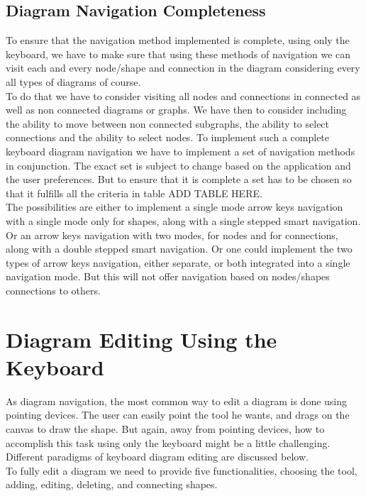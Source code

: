 \begin{itemize}
\subsection{Diagram Navigation Completeness}
\par \noindent
To ensure that the navigation method implemented is complete, using only the keyboard, we have to make sure that using these methods of navigation we can visit each and every node/shape and connection in the diagram considering every all types of diagrams of course.\\
To do that we have to consider visiting all nodes and connections in connected as well as non connected diagrams or graphs. We have then to consider including the ability to move between non connected subgraphs, the ability to select connections and the ability to select nodes. To implement such a complete keyboard diagram navigation we have to implement a set of navigation methods in conjunction. The exact set is subject to change based on the application and the user preferences. But to ensure that it is complete a set has to be chosen so that it fulfills all the criteria in table ADD TABLE HERE.\\
The possibilities are either to implement a single mode arrow keys navigation with a single mode only for shapes, along with a single stepped smart navigation. Or an arrow keys navigation with two modes, for nodes and for connections, along with a double stepped smart navigation. Or one could implement the two types of arrow keys navigation, either separate, or both integrated into a single navigation mode. But this will not offer navigation based on nodes/shapes connections to others.

\end{itemize}


\section{Diagram Editing Using the Keyboard}
\par \noindent
As diagram navigation, the most common way to edit a diagram is done using pointing devices. The user can easily point the tool he wants, and drags on the canvas to draw the shape. But again, away from pointing devices, how to accomplish this task using only the keyboard might be a little challenging. Different paradigms of keyboard diagram editing are discussed below.\\
To fully edit a diagram we need to provide five functionalities, choosing the tool, adding, editing, deleting, and connecting shapes.

